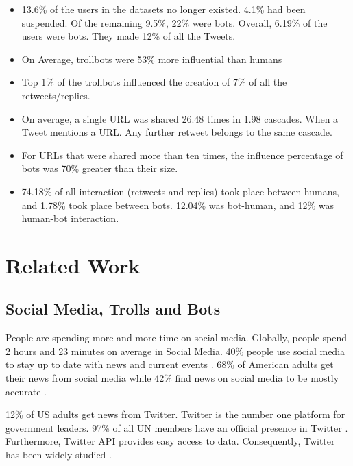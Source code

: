 \documentclass[letterpaper]{article}
\begin{document}
\begin{itemize}
    \item 13.6\% of the users in the datasets no longer existed. 4.1\% had been suspended. Of the remaining 9.5\%, 22\% were bots. Overall, 6.19\% of the users were bots. They made 
    12\% of all the Tweets.
    \item On Average, trollbots were 53\% more influential than humans
    \item Top 1\% of the trollbots influenced the creation of 7\% of all the retweets/replies.
    \item On average, a single URL was shared 26.48 times in 1.98 cascades. When a Tweet 
    mentions a URL. Any further retweet belongs to the same cascade.
    \item For URLs that were shared more than ten times, the influence percentage of bots was 70\% greater than their 
    size.
    \item 74.18\% of all interaction (retweets and replies) took place between humans, and 1.78\% took place between 
    bots. 12.04\% was bot-human, and 12\% was human-bot interaction.
\end{itemize}
   
\section{Related Work}
\label{sec:related}

\subsection{Social Media, Trolls and Bots}
People are spending more and more time on social media. Globally, people spend 2 hours and 23 minutes on average in Social Media. 40\%  people use social media to stay up to date 
with news and current events \cite{2019_social_flagship_report}. 68\% of American adults get their news from
social media while 42\% find news on social media to be mostly accurate \cite{pew_research_news}.\par

12\% of US adults get news from Twitter\cite{pew_research_news}. Twitter is the number one platform for government 
leaders. 97\% of all UN members have an official presence in Twitter \cite{twiplomacy}. Furthermore, Twitter API 
provides easy access to data. Consequently, Twitter has been widely studied \cite{rizoiu2018debatenight,grinberg2019fake,bovet2019influence,morstatter2018alt,munger2017don,gruzd2014investigating,zannettou2019characterizing,howard2016bots}.
\par
\end{document}
